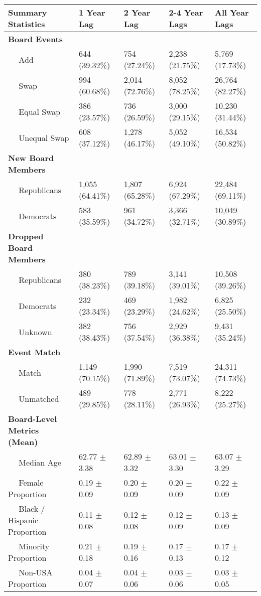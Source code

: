 
\begin{tabular}{lllll}
\toprule
Summary Statistics & 1 Year Lag & 2 Year Lag & 2-4 Year Lags & All Year Lags\\
\midrule
\bf{Board Events} & ~ & ~ & ~ & ~\\
~~ Add & 644 (39.32\%) & 754 (27.24\%) & 2,238 (21.75\%) & 5,769 (17.73\%)\\
~~ Swap & 994 (60.68\%) & 2,014 (72.76\%) & 8,052 (78.25\%) & 26,764 (82.27\%)\\
~~ Equal Swap & 386 (23.57\%) & 736 (26.59\%) & 3,000 (29.15\%) & 10,230 (31.44\%)\\
~~ Unequal Swap & 608 (37.12\%) & 1,278 (46.17\%) & 5,052 (49.10\%) & 16,534 (50.82\%)\\
\addlinespace
\bf{New Board Members} & ~ & ~ & ~ & ~\\
~~ Republicans & 1,055 (64.41\%) & 1,807 (65.28\%) & 6,924 (67.29\%) & 22,484 (69.11\%)\\
~~ Democrats & 583 (35.59\%) & 961 (34.72\%) & 3,366 (32.71\%) & 10,049 (30.89\%)\\
\bf{Dropped Board Members} & ~ & ~ & ~ & ~\\
~~ Republicans & 380 (38.23\%) & 789 (39.18\%) & 3,141 (39.01\%) & 10,508 (39.26\%)\\
\addlinespace
~~ Democrats & 232 (23.34\%) & 469 (23.29\%) & 1,982 (24.62\%) & 6,825 (25.50\%)\\
~~ Unknown & 382 (38.43\%) & 756 (37.54\%) & 2,929 (36.38\%) & 9,431 (35.24\%)\\
\bf{Event Match} & ~ & ~ & ~ & ~\\
~~ Match & 1,149 (70.15\%) & 1,990 (71.89\%) & 7,519 (73.07\%) & 24,311 (74.73\%)\\
~~ Unmatched & 489 (29.85\%) & 778 (28.11\%) & 2,771 (26.93\%) & 8,222 (25.27\%)\\
\addlinespace
\bf{Board-Level Metrics (Mean)} & ~ & ~ & ~ & ~\\
~~ Median Age & 62.77 $\pm$ 3.38 & 62.89 $\pm$ 3.32 & 63.01 $\pm$ 3.30 & 63.07 $\pm$ 3.29\\
~~ Female Proportion & 0.19 $\pm$ 0.09 & 0.20 $\pm$ 0.09 & 0.20 $\pm$ 0.09 & 0.22 $\pm$ 0.09\\
~~ Black / Hispanic Proportion & 0.11 $\pm$ 0.08 & 0.12 $\pm$ 0.08 & 0.12 $\pm$ 0.09 & 0.13 $\pm$ 0.09\\
~~ Minority Proportion & 0.21 $\pm$ 0.18 & 0.19 $\pm$ 0.16 & 0.17 $\pm$ 0.13 & 0.17 $\pm$ 0.12\\
\addlinespace
~~ Non-USA Proportion & 0.04 $\pm$ 0.07 & 0.04 $\pm$ 0.06 & 0.03 $\pm$ 0.06 & 0.03 $\pm$ 0.05\\

\end{tabular}
